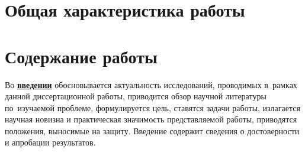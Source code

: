 \section*{Общая характеристика работы}

\newcommand{\actuality}{\pdfbookmark[1]{Актуальность}{actuality}\underline{\textbf{\actualityTXT}}}
\newcommand{\progress}{\pdfbookmark[1]{Разработанность темы}{progress}\underline{\textbf{\progressTXT}}}
\newcommand{\aim}{\pdfbookmark[1]{Цели}{aim}\underline{{\textbf\aimTXT}}}
\newcommand{\tasks}{\pdfbookmark[1]{Задачи}{tasks}\underline{\textbf{\tasksTXT}}}
\newcommand{\aimtasks}{\pdfbookmark[1]{Цели и задачи}{aimtasks}\aimtasksTXT}
\newcommand{\novelty}{\pdfbookmark[1]{Научная новизна}{novelty}\underline{\textbf{\noveltyTXT}}}
\newcommand{\influence}{\pdfbookmark[1]{Практическая значимость}{influence}\underline{\textbf{\influenceTXT}}}
\newcommand{\methods}{\pdfbookmark[1]{Методология и методы исследования}{methods}\underline{\textbf{\methodsTXT}}}
\newcommand{\defpositions}{\pdfbookmark[1]{Положения, выносимые на защиту}{defpositions}\underline{\textbf{\defpositionsTXT}}}
\newcommand{\reliability}{\pdfbookmark[1]{Достоверность}{reliability}\underline{\textbf{\reliabilityTXT}}}
\newcommand{\probation}{\pdfbookmark[1]{Апробация}{probation}\underline{\textbf{\probationTXT}}}
\newcommand{\contribution}{\pdfbookmark[1]{Личный вклад}{contribution}\underline{\textbf{\contributionTXT}}}
\newcommand{\publications}{\pdfbookmark[1]{Публикации}{publications}\underline{\textbf{\publicationsTXT}}}




\section*{Содержание работы}
Во \underline{\textbf{введении}} обосновывается актуальность
исследований, проводимых в~рамках данной диссертационной работы,
приводится обзор научной литературы по~изучаемой проблеме,
формулируется цель, ставятся задачи работы, излагается научная новизна
и практическая значимость представляемой работы, приводятся положения,
выносимые на защиту. 
Введение содержит сведения о достоверности и апробации результатов.



